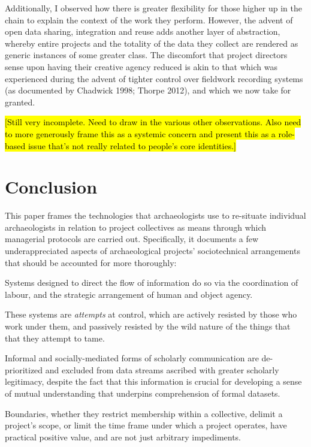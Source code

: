 \documentclass[
  canadian,
]{article}
\begin{document}
Additionally, I observed how there is greater flexibility for those
higher up in the chain to explain the context of the work they perform.
However, the advent of open data sharing, integration and reuse adds
another layer of abstraction, whereby entire projects and the totality
of the data they collect are rendered as generic instances of some
greater class. The discomfort that project directors sense upon having
their creative agency reduced is akin to that which was experienced
during the advent of tighter control over fieldwork recording systems
(as documented by Chadwick 1998; Thorpe 2012), and which we now take for
granted.

\hl{{[}Still very incomplete. Need to draw in the various other
observations. Also need to more generously frame this as a systemic
concern and present this as a role-based issue that's not really related
to people's core identities.{]}}

\section{Conclusion}\label{conclusion}

This paper frames the technologies that archaeologists use to re-situate
individual archaeologists in relation to project collectives as means
through which managerial protocols are carried out. Specifically, it
documents a few underappreciated aspects of archaeological projects'
sociotechnical arrangements that should be accounted for more
thoroughly:

Systems designed to direct the flow of information do so via the
coordination of labour, and the strategic arrangement of human and
object agency.

These systems are \emph{attempts} at control, which are actively
resisted by those who work under them, and passively resisted by the
wild nature of the things that that they attempt to tame.

Informal and socially-mediated forms of scholarly communication are
de-prioritized and excluded from data streams ascribed with greater
scholarly legitimacy, despite the fact that this information is crucial
for developing a sense of mutual understanding that underpins
comprehension of formal datasets.

Boundaries, whether they restrict membership within a collective,
delimit a project's scope, or limit the time frame under which a project
operates, have practical positive value, and are not just arbitrary
impediments.
\end{document}
